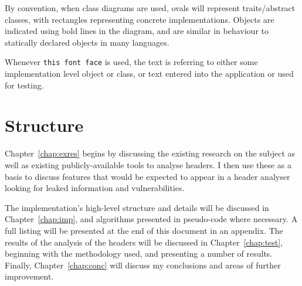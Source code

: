 \documentclass[a4paper,DIV=13,BCOR=7mm,abstract=yes,twoside,10pt]{scrreprt}
\begin{document}
    By convention, when class diagrams are used, ovals will represent
    traits/abstract classes, with rectangles representing concrete
    implementations. Objects are indicated using bold lines in the diagram, and
    are similar in behaviour to statically declared objects in many languages.

    Whenever \texttt{this font face} is used, the text is referring to either
    some implementation level object or class, or text entered into the
    application or used for testing.


    \section{Structure}

    Chapter~\ref{chap:exres} begins by discussing the existing research on
    the subject as well as existing publicly-available tools to analyse
    headers.  I then use these as a basis to discuss features that would be
    expected to appear in a header analyser looking for leaked information
    and vulnerabilities.

    The implementation's high-level structure and details will be discussed in
    Chapter~\ref{chap:imp}, and algorithms presented in pseudo-code where
    necessary.  A full listing will be presented at the end of this document in
    an appendix. The results of the analysis of the headers will be discussed in
    Chapter~\ref{chap:test}, beginning with the methodology used, and presenting
    a number of results. Finally, Chapter~\ref{chap:conc} will discuss my
    conclusions and areas of further improvement.

     
     

    \printbibliography{} 
\end{document}
